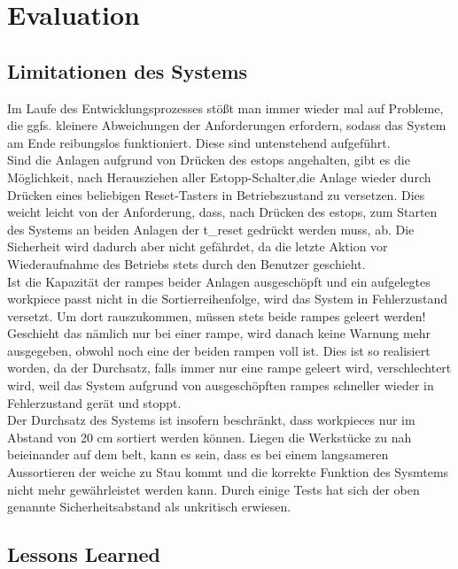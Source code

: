 \chapter{Evaluation}\label{ch:evaluation}


\section{Limitationen des Systems}\label{sec:limitations}

Im Laufe des Entwicklungsprozesses stößt man immer wieder mal auf Probleme, die ggfs. kleinere Abweichungen der
Anforderungen erfordern, sodass das System am Ende reibungslos funktioniert. Diese sind untenstehend aufgeführt.\\

Sind die Anlagen aufgrund von Drücken des \gls{estop}s angehalten, gibt es die Möglichkeit, nach Herausziehen aller
Estopp-Schalter,die Anlage wieder durch Drücken eines beliebigen Reset-Tasters in Betriebszustand zu versetzen. Dies weicht leicht
von der Anforderung, dass, nach Drücken des \gls{estop}s, zum Starten des Systems an beiden Anlagen der \gls{t_reset} gedrückt
werden muss, ab. Die Sicherheit wird dadurch aber nicht gefährdet, da die letzte Aktion vor Wiederaufnahme des Betriebs
stets durch den Benutzer geschieht.\\

Ist die Kapazität der \glspl{rampe} beider Anlagen ausgeschöpft und ein aufgelegtes \gls{workpiece} passt nicht in die
Sortierreihenfolge, wird das System in Fehlerzustand versetzt. Um dort rauszukommen, müssen stets beide \glspl{rampe} geleert
werden! Geschieht das nämlich nur bei einer \gls{rampe}, wird danach keine Warnung mehr ausgegeben, obwohl noch eine der
beiden \gls{rampe}n voll ist. Dies ist so realisiert worden, da der Durchsatz, falls immer nur eine \gls{rampe} geleert wird,
verschlechtert wird, weil das System aufgrund von ausgeschöpften \glspl{rampe} schneller wieder in Fehlerzustand gerät und
stoppt.\\

Der Durchsatz des Systems ist insofern beschränkt, dass \glspl{workpiece} nur im Abstand von 20 cm sortiert werden können.
Liegen die Werkstücke zu nah beieinander auf dem \gls{belt}, kann es sein, dass es bei einem langsameren Aussortieren
der \gls{weiche} zu Stau kommt und die korrekte Funktion des Sysmtems nicht mehr gewährleistet werden kann.
Durch einige Tests hat sich der oben genannte Sicherheitsabstand als unkritisch erwiesen.

\section{Lessons Learned}\label{sec:lessons-learned}